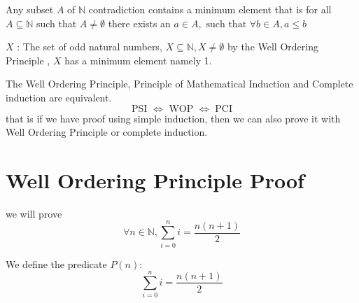 \documentclass[11pt]{book}
\begin{document}
\begin{defn}\label{defn:well_ordering_principle}
    Any subset $A $ of $\mathbb{N} $ contradiction contains a minimum element that is for all $A\subseteq \mathbb{N} $ such that $A\neq \emptyset $ there exists an $a \in A, \text{ such that } \forall b \in A, a \le b$  
\end{defn}

\begin{eg}
    $X$ : The set of odd natural numbers, $X \subseteq \mathbb{N} , X \neq \emptyset $ by the Well Ordering Principle , $X$ has a minimum element namely 1.
\end{eg}

\begin{thm}\label{thm:well_ordering_principle_and_induction_equivalence}
    The Well Ordering Principle, Principle of Mathematical Induction and Complete induction are equivalent.
    \[
    \text{ PSI } \Leftrightarrow \text{ WOP } \Leftrightarrow \text{ PCI } 
    \]
    that is if we have proof using simple induction, then we can also prove it with Well Ordering Principle or complete induction.
\end{thm}



\section{Well Ordering Principle Proof}%
\label{sec:well_ordering_principle_proof}

we will prove 
\[
    \forall n \in \mathbb{N} , \sum_{i=0}^{n} i = \frac{n\left( n + 1 \right) }{2} 
\]

We define the predicate $P\left(n\right) :$ 
\[
    \sum_{i=0}^{n} i = \frac{n\left( n + 1 \right) }{2} 
\]

\newpage
\end{document}
